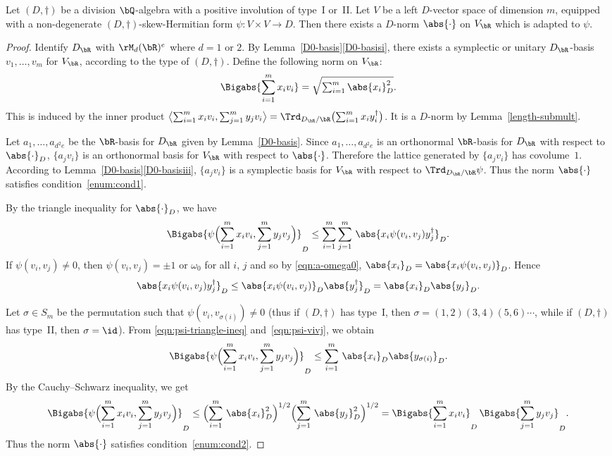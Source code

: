 \begin{lemma} \label{good-norm}
Let $(D,\dag)$ be a division $\bQ$-algebra with a positive involution of type~I or~II.
Let $V$ be a left $D$-vector space of dimension $m$, equipped with a non-degenerate $(D,\dag)$-skew-Hermitian form $\psi \colon V \times V \to D$.
Then there exists a $D$-norm $\abs{\cdot}$ on $V_\bR$ which is adapted to $\psi$.
\end{lemma}
\begin{proof}
Identify $D_\bR$ with $\rM_d(\bR)^e$ where $d = 1$ or $2$.
By Lemma~\ref{D0-basis}\eqref{D0-basisi}, there exists a symplectic or unitary $D_\bR$-basis $v_1, \dotsc, v_m$ for $V_\bR$, according to the type of $(D,\dag)$.
Define the following norm on $V_\bR$:
\[
\Bigabs{\sum_{i=1}^m x_i v_i} = \sqrt{\textstyle\sum_{i=1}^m \abs{x_i}_D^2}.
\]
This is induced by the inner product $\bigl\langle \sum_{i=1}^m x_i v_i, \sum_{j=1}^m y_j v_i \bigr\rangle = \Trd_{D_\bR/\bR} \bigl(\sum_{i=1}^m x_i y_i^\dag\bigr)$.
It is a $D$-norm by Lemma~\ref{length-submult}.

Let $a_1, \dotsc, a_{d^2e}$ be the $\bR$-basis for $D_\bR$ given by Lemma~\ref{D0-basis}.
Since $a_1, \dotsc, a_{d^2e}$ is an orthonormal $\bR$-basis for $D_\bR$ with respect to $\abs{\cdot}_D$,
$\{ a_j v_i \}$ is an orthonormal basis for $V_\bR$ with respect to $\abs{\cdot}$.
Therefore the lattice generated by $\{ a_j v_i \}$ has covolume~$1$.
According to Lemma~\ref{D0-basis}\eqref{D0-basisiii}, $\{ a_j v_i \}$ is a symplectic basis for $V_\bR$ with respect to $\Trd_{D_\bR/\bR} \psi$.
Thus the norm $\abs{\cdot}$ satisfies condition~\eqref{enum:cond1}.

By the triangle inequality for $\abs{\cdot}_D$, we have
\begin{equation} \label{eqn:psi-triangle-ineq}
\Bigabs{\psi \Bigl( \sum_{i=1}^m x_i v_i, \sum_{j=1}^m y_j v_j \Bigr)}_D
\leq \sum_{i=1}^m \sum_{j=1}^m\, \abs{x_i \psi(v_i, v_j) y_j^\dag}_D.
\end{equation}
If $\psi(v_i, v_j) \neq 0$, then $\psi(v_i, v_j) = \pm 1$ or $\omega_0$ for all $i$, $j$ and so by \eqref{eqn:a-omega0},
$\abs{x_i}_D = \abs{x_i \psi(v_i, v_j)}_D$. Hence
\begin{equation} \label{eqn:psi-vivj}
\abs{x_i \psi(v_i, v_j) y_j^\dag}_D \leq \abs{x_i \psi(v_i, v_j)}_D \abs{y_j^\dag}_D = \abs{x_i}_D \abs{y_j}_D.
\end{equation}

Let $\sigma \in S_m$ be the permutation such that $\psi(v_i, v_{\sigma(i)}) \neq 0$ (thus if $(D,\dag)$ has type~I, then $\sigma = (1,2)(3,4)(5,6)\dotsm$, while if $(D,\dag)$ has type~II, then $\sigma=\id$).
From \eqref{eqn:psi-triangle-ineq} and~\eqref{eqn:psi-vivj}, we obtain
\[
\Bigabs{\psi \Bigl( \sum_{i=1}^m x_i v_i, \sum_{j=1}^m y_j v_j \Bigr)}_D
\leq \sum_{i=1}^m\, \abs{x_i}_D \abs{y_{\sigma(i)}}_D.
\]
By the Cauchy--Schwarz inequality, we get
\[
\Bigabs{\psi \Bigl( \sum_{i=1}^m x_i v_i, \sum_{j=1}^m y_j v_j \Bigr)}_D
\leq \Bigl( \sum_{i=1}^m\, \abs{x_i}_D^2 \Bigr)^{1/2} \Bigl( \sum_{j=1}^m\, \abs{y_j}_D^2 \Bigr)^{1/2}
= \Bigabs{\sum_{i=1}^m x_iv_i}_D \, \Bigabs{\sum_{j=1}^m y_jv_j}_D.
\]
Thus the norm $\abs{\cdot}$ satisfies condition~\eqref{enum:cond2}.
\end{proof}


